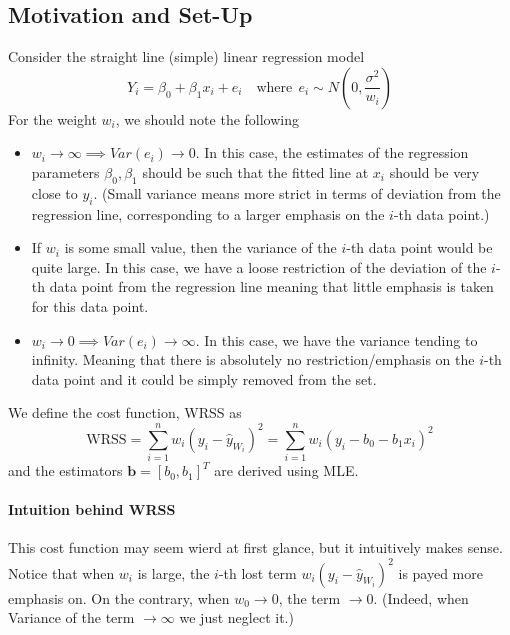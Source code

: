 \documentclass[11pt]{article}
\newcommand{\bb}{\mathbf{b}}
\begin{document}
\subsection{Motivation and Set-Up}
Consider the straight line (simple) linear regression model
\begin{equation*}
    Y_{i}=\beta_{0}+\beta_{1} x_{i}+e_{i} \quad \text{where}~~ e_i \sim N \left(0, \frac{\sigma^2}{w_i}\right)
\end{equation*}
For the weight $w_i$, we should note the following
\begin{itemize}
    \item $w_i \rightarrow \infty \implies Var(e_i) \rightarrow 0$. In this case, the estimates of the regression parameters $\beta_0, \beta_1$ should be such that the fitted line at $x_i$ should be very close to $y_i$. (Small variance means more strict in terms of deviation from the regression line, corresponding to a larger emphasis on the $i$-th data point.)
    \item If $w_i$ is some small value, then the variance of the $i$-th data point would be quite large. In this case, we have a loose restriction of the deviation of the $i$-th data point from the regression line meaning that little emphasis is taken for this data point.
    \item $w_i \rightarrow 0 \implies Var(e_i) \rightarrow \infty$. In this case, we have the variance tending to infinity. Meaning that there is absolutely no restriction/emphasis on the $i$-th data point and it could be simply removed from the set.
\end{itemize}
We define the cost function, WRSS as
\begin{equation*}
    \mathrm{WRSS}=\sum_{i=1}^{n} w_{i}\left(y_{i}-\hat{y}_{W_i}\right)^{2}=\sum_{i=1}^{n} w_{i}\left(y_{i}-b_{0}-b_{1} x_{i}\right)^{2}
\end{equation*}
and the estimators $\bb = [b_0, b_1]^T$ are derived using MLE. 

\paragraph{Intuition behind WRSS} This cost function may seem wierd at first glance, but it intuitively makes sense. Notice that when $w_i$ is large, the $i$-th lost term $w_{i}\left(y_{i}-\hat{y}_{W_i}\right)^{2}$ is payed more emphasis on. On the contrary, when $w_0 \rightarrow 0$, the term $\rightarrow 0$. (Indeed, when Variance of the term $\rightarrow \infty$ we just neglect it.)
\end{document}
